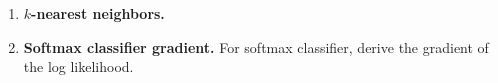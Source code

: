 \documentclass{article}
\newenvironment{response}{\begin{responseframe}\vspace{-10pt}\paragraph{Response:}}{\end{responseframe}}
\renewcommand{\bf}[1]{\textbf{{#1}}}
\begin{document}
\begin{enumerate}
\begin{enumerate}
                \item Based on your answer to (a), under expectation what regularization effect
                    would the addition of the noise have on the model?
                    \begin{response}
                        $L^2$
                    \end{response}
                \item Suppose $\sigma \longrightarrow 0$, what effect would this have on the model?
                    \begin{response}
                        If $\sigma \longrightarrow 0$, there is no regularization which means there 
                        may be overfitting.
                    \end{response}
                \item Suppose $\sigma \longrightarrow \infty$, what effect would this have on the model?
                    \begin{response}
                        If $\sigma \longrightarrow \infty$, we are optimizing for the $R$ term which
                        means there may be underfitting.
                    \end{response}
            \end{enumerate}

        \item \bf{$k$-nearest neighbors.}

        \item \bf{Softmax classifier gradient.} For softmax classifier, derive the gradient of the log
            likelihood. \vspace{10pt}


\end{enumerate}
\end{document}

